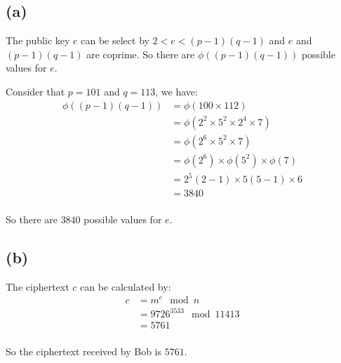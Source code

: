 \documentclass[a4paper,12pt]{article}
\begin{document}
\subsection{(a)}
The public key $e$ can be select by $2 < e < (p - 1)(q - 1)$ and $e$ and $(p - 1)(q - 1)$ are coprime. So there are $\phi((p - 1)(q - 1))$ possible values for $e$.

Consider that $p = 101$ and $q = 113$, we have:
\begin{equation}
    \begin{aligned}
        \phi((p - 1)(q - 1)) & = \phi(100 \times 112)                      \\
                             & = \phi(2^2 \times 5^2  \times 2^4 \times 7) \\
                             & = \phi(2^6 \times 5^2 \times 7)             \\
                             & = \phi(2^6) \times \phi(5^2) \times \phi(7) \\
                             & = 2^5(2 - 1) \times 5(5 - 1) \times 6       \\
                             & = 3840                                      \\
    \end{aligned}
\end{equation}

So there are $3840$ possible values for $e$.
\subsection{(b)}
The ciphertext $c$ can be calculated by:
\begin{equation}
    \begin{aligned}
        c & = m^e \mod n             \\
          & = 9726^{3533} \mod 11413 \\
          & = 5761                   \\
    \end{aligned}
\end{equation}

So the ciphertext received by Bob is $5761$.
\end{document}
